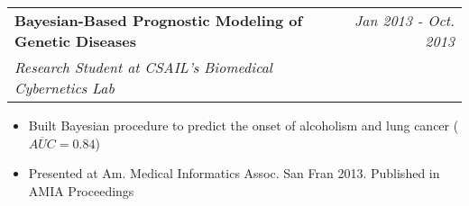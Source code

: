 \documentclass[letterpaper,11pt]{article}
\makeatletter
\newcommand{\resitem}[1]{\item[--] #1 \vspace{-6pt}}
\newcommand{\ressubheading}[4]{
\begin{tabular*}{7in}{l@{\extracolsep{\fill}}r}
	\textbf{#1} & \textit{#2} \\
	\textit{#3} & \textit{#4}\\
\end{tabular*}\vspace{-6pt}}
\makeatother
\begin{document}
\vspace{0.05in}

	\ressubheading{Bayesian-Based Prognostic Modeling of Genetic Diseases}{Jan 2013 - Oct. 2013}{Research Student at CSAIL's Biomedical Cybernetics Lab}{}
	\begin{itemize}
			\resitem{Built Bayesian procedure to predict the onset of alcoholism and lung cancer ($\overline{AUC} =0.84$)}
		\resitem{Presented at Am. Medical Informatics Assoc. San Fran 2013. Published in AMIA Proceedings}
	\end{itemize}
\end{document}
